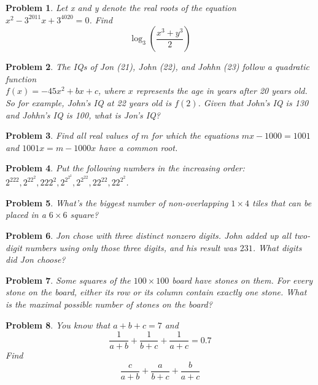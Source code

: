 \documentclass[a4paper,12pt]{article}
\theoremstyle{perfect}
\newtheorem{prb}{Problem}
\begin{document}
\begin{prb}
Let x and y denote the real roots of the equation $x^2 - 3^{2011}x + 3^{4020} = 0$. Find $$\log_3\left(\frac{x^3 + y^3}{2}\right)$$
\end{prb}

\begin{prb}
The IQs of Jon (21), John (22), and Johhn (23) follow a quadratic function\\ $f(x) = -45x^2 + bx + c$, where $x$ represents the age in years after 20 years old. So for example, John's IQ at 22 years old is $f(2)$. Given that John's IQ is 130 and Johhn's IQ is 100, what is Jon's IQ?
\end{prb}


\begin{prb}
Find all real values of $m$ for which the equations $mx-1000=1001$ and $1001x = m - 1000x$ have a common root.
\end{prb}

\begin{prb}
Put the following numbers in the increasing order: $2^{222}, 2^{22^2}, 222^2, 2^{2^{2^2}}, 2^{2^{22}}, 22^{22}, 22^{2^2}$. 
\end{prb}


\begin{prb}
What's the biggest number of non-overlapping $1\times 4$ tiles that can be placed in a $6\times 6$ square?
\end{prb}

\begin{prb}
Jon chose with three distinct nonzero digits. John added up all two-digit numbers using only those three digits, and his result was $231$. What digits did Jon choose?
\end{prb}

\begin{prb}
Some squares of the $100\times 100$ board have stones on them. For every stone on the board, either its row or its column contain exactly one stone. What is the maximal possible number of stones on the board?
\end{prb}

\begin{prb}
You know that $a+b+c=7$ and $$\frac{1}{a+b} + \frac{1}{b+c} + \frac{1}{a+c} = 0.7$$ Find $$\frac{c}{a+b} + \frac{a}{b+c} + \frac{b}{a+c}$$
\end{prb}
\end{document}
